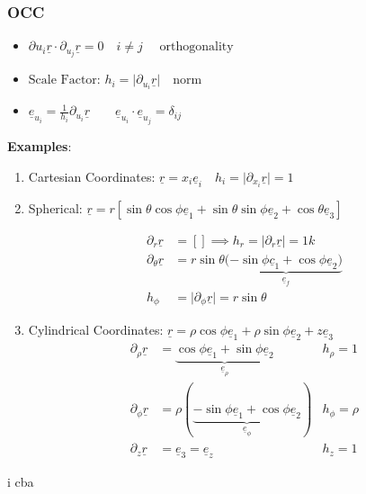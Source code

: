 \documentclass{article}
\begin{document}
\subsubsection{OCC}

\begin{itemize}
    \item $\partial u_{i} \underline{r} \cdot \partial_{u_{j}} \underline{r} = 0 \quad i\ne j \quad \text{ orthogonality}$
    \item $\text{Scale Factor: }h_{i} = \lvert \partial_{u_{i}} \underline{r}\rvert\quad \text{norm}$
    \item $\underline{e}_{u_{i}} = \frac{1}{h_{i}}\partial_{u_{i}}\underline{r} \qquad \underline{e}_{u_{i}} \cdot \underline{e}_{u_{j}} = \delta_{ij}$
\end{itemize}

\textbf{Examples}:
\begin{enumerate}
    \item Cartesian Coordinates: $\underline{r} = x_{i}\underline{e}_{i} \quad h_{i} = \lvert \partial_{x_{i}} \underline{r} \rvert = 1$
    \item Spherical: $\underline{r} = r [\sin\theta\cos\phi\underline{e}_{1} + \sin\theta\sin\phi\underline{e}_{2} + \cos\theta\underline{e}_{3}]$

    \begin{align*}
    \partial_{r}\underline{r} &= [] \implies h_{r} = \lvert \partial_{r}\underline{r} \rvert = 1k \\
    \partial_{\theta}\underline{r} &= r\sin\theta(\underbrace{-\sin\phi\underline{c}_{1} + \cos\phi\underline{e}_{2})}_{\underline{e}_{f}} \\
    h_{\phi} &= \lvert \partial_{\phi}\underline{r} \rvert = r\sin\theta
    \end{align*}

\item Cylindrical Coordinates: $\underline{r} = \rho\cos\phi\underline{e}_{1} + \rho\sin\phi\underline{e}_{2} + z\underline{e}_{3}$
    \begin{align*}
        \partial_{\rho}\underline{r} &= \underbrace{\cos\phi\underline{e}_{1} + \sin\phi\underline{e}_{2}}_{\underline{e}_{\rho}} & h_{\rho} = 1 \\
        \partial_{\phi}\underline{r} &= \rho (\underbrace{-\sin\phi\underline{e}_{1} + \cos\phi\underline{e}_{2}}_{\underline{e}_{\phi}}) & h_{\phi} = \rho \\
        \partial_{z}\underline{r} &= \underline{e}_{3} = \underline{e}_{z} & h_{z} = 1
    \end{align*}
\end{enumerate}

i cba
\end{document}
